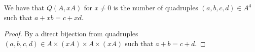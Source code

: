\begin{lemma}
    \leanok
    We have that $Q(A, x A)$ for $x \neq 0$ is the number of quadruples $(a, b, c, d) \in A^4$ such that $a + x b = c + x d$.
\end{lemma}

\begin{proof}
    \leanok
    By a direct bijection from quadruples $(a, b, c, d) \in A \times (xA) \times A \times (xA)$ such that $a + b = c + d$.
\end{proof}

\printbibliography